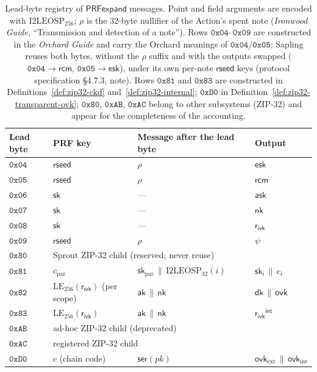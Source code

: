 \documentclass[11pt,a4paper]{article}
\theoremstyle{definition}
\newcommand{\ask}{\ensuremath{\mathsf{ask}}}
\newcommand{\aksym}{\ensuremath{\mathsf{ak}}}
\newcommand{\nksym}{\ensuremath{\mathsf{nk}}}
\newcommand{\ovk}{\ensuremath{\mathsf{ovk}}}
\newcommand{\dk}{\ensuremath{\mathsf{dk}}}
\newcommand{\rcm}{\ensuremath{\mathsf{rcm}}}
\newcommand{\rivk}{\ensuremath{\mathsf{r_{ivk}}}}
\begin{document}
\begin{table}[htbp]
\centering
\small
\begin{tabular}{@{}llll@{}}
\toprule
Lead byte & PRF key & Message after the lead byte & Output \\
\midrule
$\mathtt{0x04}$ & $\mathsf{rseed}$ & $\rho$ & $\mathsf{esk}$ \\
$\mathtt{0x05}$ & $\mathsf{rseed}$ & $\rho$ & $\rcm$ \\
$\mathtt{0x06}$ & $\mathsf{sk}$ & --- & $\ask$ \\
$\mathtt{0x07}$ & $\mathsf{sk}$ & --- & $\nksym$ \\
$\mathtt{0x08}$ & $\mathsf{sk}$ & --- & $\rivk$ \\
$\mathtt{0x09}$ & $\mathsf{rseed}$ & $\rho$ & $\psi$ \\
$\mathtt{0x80}$ & \multicolumn{3}{l}{Sprout ZIP-32 child (reserved; never reuse)} \\
$\mathtt{0x81}$ & $c_{\mathrm{par}}$ &
  $\mathsf{sk}_{\mathrm{par}} \,\|\, \mathrm{I2LEOSP}_{32}(i)$ &
  $\mathsf{sk}_i \,\|\, c_i$ \\
$\mathtt{0x82}$ & $\mathrm{LE}_{256}(\rivk)$ (per scope) &
  $\aksym \,\|\, \nksym$ & $\dk \,\|\, \ovk$ \\
$\mathtt{0x83}$ & $\mathrm{LE}_{256}(\rivk)$ & $\aksym \,\|\, \nksym$ & $\rivk^{\mathsf{int}}$ \\
$\mathtt{0xAB}$ & \multicolumn{3}{l}{ad-hoc ZIP-32 child (deprecated)} \\
$\mathtt{0xAC}$ & \multicolumn{3}{l}{registered ZIP-32 child} \\
$\mathtt{0xD0}$ & $c$ (chain code) & $\mathsf{ser}(pk)$ &
  $\ovk_{\mathrm{ext}} \,\|\, \ovk_{\mathrm{int}}$ \\
\bottomrule
\end{tabular}
\caption{Lead-byte registry of $\mathsf{PRFexpand}$ messages. Point and
field arguments are encoded with $\mathrm{I2LEOSP}_{256}$; $\rho$ is the
$32$-byte nullifier of the Action's spent note (\emph{Ironwood Guide},
``Transmission and detection of a note''). Rows
$\mathtt{0x04}$--$\mathtt{0x09}$ are constructed in the \emph{Orchard
Guide} and carry the Orchard meanings of $\mathtt{0x04}$/$\mathtt{0x05}$;
Sapling reuses both bytes, without the $\rho$ suffix and with the outputs
swapped ($\mathtt{0x04} \to \rcm$, $\mathtt{0x05} \to \mathsf{esk}$),
under its own per-note $\mathsf{rseed}$ keys (protocol specification
\S4.7.3, note). Rows $\mathtt{0x81}$ and $\mathtt{0x83}$ are constructed
in
Definitions~\ref{def:zip32-ckd} and~\ref{def:zip32-internal};
$\mathtt{0xD0}$ in Definition~\ref{def:zip32-transparent-ovk};
$\mathtt{0x80}$, $\mathtt{0xAB}$, $\mathtt{0xAC}$ belong
to other subsystems (ZIP-32) and appear for the completeness of
the accounting.}\label{tab:prfexpand}
\end{table}
\end{document}
